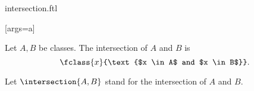 \documentclass{article}
\begin{document}
\begin{smodule}[creators={Marcel Schütz}]{intersection.ftl}

  [args=a]{}

  \begin{fdefinition*}[label=5744033011859456]
    Let $A, B$ be classes.
    The intersection of $A$ and $B$ is
    \[\fclass{x}{\text{$x \in A$ and $x \in B$}}.\]
  \end{fdefinition*}

  \begin{fconvention*}
    Let $\intersection{A,B}$ stand for the intersection of $A$ and $B$.
  \end{fconvention*}
\end{smodule}
\end{document}
